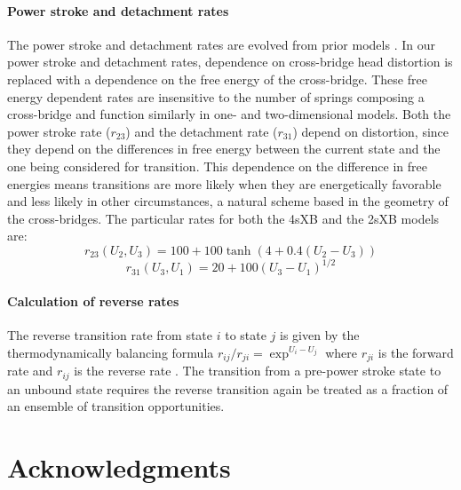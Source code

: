 \documentclass[10pt]{article}
\newcommand{\citep}[1]{\cite{#1}} %
\begin{document}
\paragraph{Power stroke and detachment rates} %
The power stroke and detachment rates are evolved from prior models \citep{Pate1989, Tanner2007}. 
In our power stroke and detachment rates, dependence on cross-bridge head distortion is replaced with a dependence on the free energy of the cross-bridge.
These free energy dependent rates are insensitive to the number of springs composing a cross-bridge and function similarly in one- and two-dimensional models. 
Both the power stroke rate ($r_{23}$) and the detachment rate ($r_{31}$) depend on distortion, since they depend on the differences in free energy between the current state and the one being considered for transition.  
This dependence on the difference in free energies means transitions are more likely when they are energetically favorable and less likely in other circumstances, a natural scheme based in the geometry of the cross-bridges.
The particular rates for both the 4sXB and the 2sXB models are: 
$$r_{23}(U_2, U_3) = 100 + 100\tanh(4 + 0.4 (U_2 - U_3)) $$
$$r_{31}(U_3, U_1) = 20 + 100 (U_3 - U_1)^{1/2} $$

\paragraph{Calculation of reverse rates} %
The reverse transition rate from state $i$ to state $j$ is given by the thermodynamically balancing formula $r_{ij}/r_{ji}=\exp^{U_i-U_j}$ where $r_{ji}$ is the forward rate and $r_{ij}$ is the reverse rate \citep{Pate1989, Daniel1998, Tanner2007}.
The transition from a pre-power stroke state to an unbound state requires the reverse transition again be treated as a fraction of an ensemble of transition opportunities. 



\section*{Acknowledgments} %



\clearpage

\end{document}
